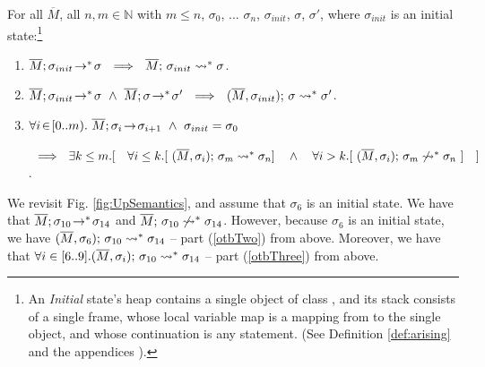  \begin{lemma}
\label{lemma:orig:to:bounded}
For all $\overline M$, all $n,m\in \mathbb{N}$ with $m\leq n$, $\sigma_0$, ... $\sigma_n$,  $\sigma_{init}$, $\sigma$, $\sigma'$, where
$\sigma_{init}$ is an initial state:\footnote{An \emph{Initial} state's heap contains a single object of class , and
its  stack   consists of a single frame, whose local variable map is a mapping from  to the single object, and whose continuation is  any statement.
(See Definition %
\ref{def:arising} and the 
{appendices %
\cite{necessityFull}).}} 
\begin{enumerate} 
\item 
\label{otbOne}
$\leadstoOrigStar {\Mtwo} {\sigma_{init}}  {\sigma}\ \ \Longrightarrow\ \  \leadstoBoundedStar {\Mtwo}  {\sigma_{init}} {\sigma}$.
\item 
\label{otbTwo}
$\leadstoOrigStar {\Mtwo} {\sigma_{init}}  {\sigma}\ \wedge\ \leadstoOrigStar {\Mtwo} {\sigma}  {\sigma'}\ \ \Longrightarrow\ \  \leadstoBoundedStarThree {\Mtwo} {\sigma} {\sigma_{init}} {\sigma'}$.
\item
\label{otbThree}
 $\forall i\!\in\! [0..m).\ \leadstoOrig  {\Mtwo} {\sigma_{i}}  {\sigma_{i+1}}\ \wedge\ \sigma_{init}=\sigma_0$ \\
\strut \hspace{0.5cm} $\ \ \Longrightarrow \ \  \exists k\leq m.[\ \ \ \forall i\leq k.[\  %
\leadstoBoundedStarThree  {\Mtwo}  {\sigma_m}  {\sigma_{i}} {\sigma_n} ]\ \ \  \wedge \ \ \ 
 \forall i> k. [\  \notLeadstoBoundedStarThree  {\Mtwo}  {\sigma_m}  {\sigma_{i}} {\sigma_n}\ ] \ \ \ ]$.
\end{enumerate} 
\end{lemma}
 



{We revisit  Fig. \ref{fig:UpSemantics}, and assume that $\sigma_6$ is an initial state.
We have that $\leadstoOrigStar {\Mtwo} {\sigma_{10}}  {\sigma_{14}}$ and $ \notLeadstoBoundedStar {\Mtwo}  {\sigma_{10}} {\sigma_{14}}$.
However, because $\sigma_6$ is an initial state, we have $\leadstoBoundedStarThree {\Mtwo}  {\sigma_{10}} {\sigma_{6}}  {\sigma_{14}}$ -- part (\ref{otbTwo}) 
from above. 
Moreover, we have that  $\forall i\in [6..9].\leadstoBoundedStarThree {\Mtwo}  {\sigma_{10}} {\sigma_{i}}  {\sigma_{14}}$ -- part (\ref{otbThree}) 
from above. 
}
 
